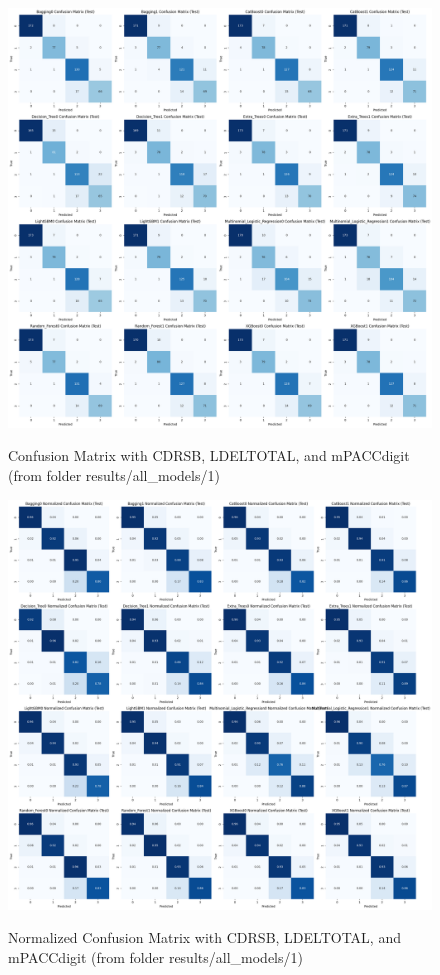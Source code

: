 \newpage

\begin{figure}[H]
	\centering
	\includegraphics[width=1\textwidth]{images/1_Confusion_Matrix.png}
	\label{fig:Confusion Matrix with CDRSB, LDELTOTAL, and mPACCdigit}
	\caption{Confusion Matrix with CDRSB, LDELTOTAL, and mPACCdigit (from folder results/all\_models/1)}
\end{figure} 

\newpage

\begin{figure}[H]
	\centering
	\includegraphics[width=1\textwidth]{images/1_Confusion_Matrix_Normalized.png}
	\label{fig:Normalized Confusion Matrix with CDRSB, LDELTOTAL, and mPACCdigit}
	\caption{Normalized Confusion Matrix with CDRSB, LDELTOTAL, and mPACCdigit (from folder results/all\_models/1)}
\end{figure}

